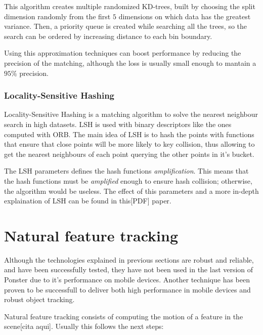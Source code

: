 This algorithm creates multiple randomized KD-trees, built by choosing the
split dimension randomly from the first $5$ dimensions on which data has the
greatest variance. Then, a priority queue is created while searching all the
trees, so the search can be ordered by increasing distance to each bin
boundary. 

Using this approximation techniques can boost performance by reducing the
precision of the matching, although the loss is usually small enough to mantain
a $95\%$ precision. 

\subsubsection{Locality-Sensitive Hashing}
Locality-Sensitive Hashing is a matching algorithm to solve the nearest
neighbour search in high datasets. LSH is used with binary descriptors like the
ones computed with ORB. The main idea of LSH is to hash the points with
functions that ensure that close points will be more likely to key collision,
thus allowing to get the nearest neighbours of each point querying the other
points in it's bucket.

The LSH parameters defines the hash functions \emph{amplification}. This means that
the hash functions must be \emph{amplified} enough to ensure hash collision;
otherwise, the algorithm would be useless. The effect of this parameters and a more
in-depth explaination of LSH can be found in this[PDF] paper.

\section{Natural feature tracking}
Although the technologies explained in previous sections are robust and reliable,
and have been successfully tested, they have not been used in the last version of
Ponster due to it's performance on mobile devices. Another technique has been proven
to be successfull to deliver both high performance in mobile devices and robust
object tracking.

Natural feature tracking consists of computing the motion of a feature in the
scene[cita aqui]. Usually this follows the next steps:
